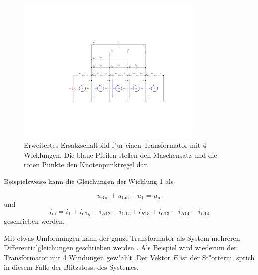 \begin{refsection}
\begin{figure}
	\centering
	\includegraphics[width=0.8\textwidth]{./trafo/images/orig_trafo.pdf}
	\caption[Erweitertes Ersatzschaltbild f"ur einen Transformator mit Maschensatz und Knotenpunkt]{Erweitertes Ersatzschaltbild f"ur einen Transformator mit 4 Wicklungen. Die blaue Pfeilen stellen den Maschensatz und die roten Punkte den Knotenpunktregel dar.}
	\label{trafo:orig}
\end{figure}

Beispielsweise kann die Gleichungen der Wicklung 1 als 

\begin{equation*}
	u_\mathrm{Rin} + u_\mathrm{Lin} + u_1 = u_\mathrm{in}
\end{equation*}
und 
\begin{equation}
	i_\mathrm{in} = i_1 + i_{C1g} + i_{R12} + i_{C12} + i_{R13} + i_{C13} + i_{R14} + i_{C14}
\end{equation}
geschrieben werden. 

Mit etwas Umformungen kann der ganze Transformator als System mehreren Differentialgleichungen geschrieben werden \cite{trafo:SeminarCHR}. Als Beispiel wird wiederum der Transformator mit 4 Windungen gew"ahlt. Der Vektor $E$ ist der St"orterm, sprich in diesem Falle der Blitzstoss, des Systemes.


\end{refsection}
